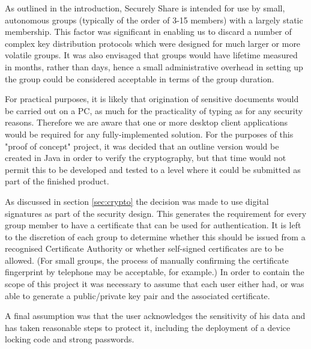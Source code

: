 As outlined in the introduction, Securely Share is intended for use by small, autonomous groups (typically of the order of 3-15 members) with a largely static membership.  This factor was significant in enabling us to discard a number of complex key distribution protocols which were designed for much larger or more volatile groups.  It was also envisaged that groups would have lifetime measured in months, rather than days, hence a small administrative overhead in setting up the group could be considered acceptable in terms of the group duration. 

For practical purposes, it is likely that origination of sensitive documents would be carried out on a PC, as much for the practicality of typing as for any security reasons.  Therefore we are aware that one or more desktop client applications would be required for any fully-implemented solution.  For the purposes of this "proof of concept" project, it was decided that an outline version would be created in Java in order to verify the cryptography, but that time would not permit this to be developed and tested to a level where it could be submitted as part of the finished product.  

As discussed in section \ref{sec:crypto} the decision was made to use digital signatures as part of the security design. This generates the requirement for every group member to have a certificate that can be used for authentication. It is left to the discretion of each group to determine  whether this should be issued from a recognised Certificate Authority or whether self-signed certificates are to be allowed.  (For small groups, the process of manually confirming the certificate fingerprint by telephone may be acceptable, for example.)  In order to contain the scope of this project it was necessary to assume that each user either had, or was able to generate a public/private key pair and the associated certificate.  

A final assumption was that the user acknowledges the sensitivity of his data and has taken reasonable steps to protect it, including the deployment of a device locking code and strong passwords.

